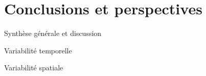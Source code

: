 \chapter{Conclusions et perspectives}
\newpage

Synthèse générale et discussion


Variabilité temporelle

Variabilité spatiale

